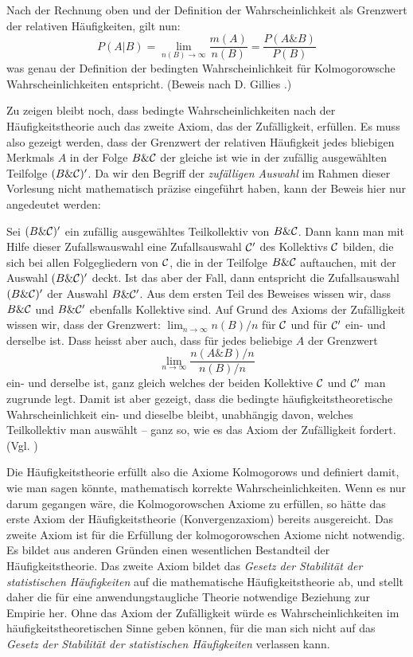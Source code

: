 Nach der Rechnung oben und der Definition der
Wahrscheinlichkeit als Grenzwert der relativen Häufigkeiten, gilt nun:
\[ P(A|B) = \lim_{n(B)\to\infty}\frac{m(A)}{n(B)} = 
            \frac{P(A\&B)}{P(B)} \]
was genau der Definition der bedingten Wahrscheinlichkeit für Kolmogorowsche
Wahrscheinlichkeiten entspricht. (Beweis nach D. Gillies
\cite[S. 111/112]{gillies:2000}.)  

Zu zeigen bleibt noch, dass bedingte Wahrscheinlichkeiten nach der
Häufigkeitstheorie auch das zweite Axiom, das der Zufälligkeit, erfüllen. Es
muss also gezeigt werden, dass der Grenzwert der relativen Häufigkeit jedes
bliebigen Merkmals $A$ in der Folge $B \& {\cal C}$ der gleiche ist wie in der
zufällig ausgewählten Teilfolge $(B \& {\cal C})'$. Da wir den Begriff der {\em
zufälligen Auswahl} im Rahmen dieser Vorlesung nicht mathematisch präzise
eingeführt haben, kann der Beweis hier nur angedeutet werden:

Sei $(B \& {\cal C})'$ ein zufällig ausgewähltes Teilkollektiv von $B \& {\cal
C}$. Dann kann man mit Hilfe dieser Zufallswauswahl eine Zufallsauswahl ${\cal C'}$
des Kollektivs ${\cal C}$ bilden, die sich bei allen Folgegliedern von ${\cal
C}$, die in der Teilfolge $B \& {\cal C}$ auftauchen, mit der Auswahl $(B \&
{\cal C})'$ deckt. Ist das aber der Fall, dann entspricht die Zufallsauswahl $(B \& {\cal
C})'$ der Auswahl $B \& {\cal C}'$. Aus dem ersten Teil des Beweises wissen
wir, dass $B \& {\cal C}$ und $B \& {\cal C'}$ ebenfalls Kollektive sind.
Auf Grund des Axioms der Zufälligkeit wissen wir, dass der Grenzwert:
$\lim_{n\to\infty}n(B)/n$ für ${\cal C}$ und für ${\cal C'}$ ein- und derselbe
ist. Dass heisst aber auch, dass für jedes beliebige $A$ der Grenzwert
\[ \lim_{n\to\infty}\frac{n(A \& B)/n}{n(B)/n} \]
ein- und derselbe ist, ganz gleich welches der beiden Kollektive ${\cal C}$ und
${\cal C'}$ man zugrunde legt. Damit ist aber gezeigt, dass die bedingte
häufigkeitstheoretische Wahrscheinlichkeit ein- und dieselbe bleibt, unabhängig
davon, welches Teilkollektiv man auswählt -- ganz so, wie es das Axiom der
Zufälligkeit fordert. (Vgl. \cite[S. 112]{gillies:2000})

Die Häufigkeitstheorie erfüllt also die Axiome Kolmogorows und definiert damit,
wie man sagen könnte, mathematisch korrekte Wahrscheinlichkeiten. Wenn es nur
darum gegangen wäre, die Kolmogorowschen Axiome zu erfüllen, so hätte das erste
Axiom der Häufigkeitstheorie (Konvergenzaxiom) bereits ausgereicht. Das zweite
Axiom ist für die Erfüllung der kolmogorowschen Axiome nicht notwendig. Es
bildet aus anderen Gründen einen wesentlichen Bestandteil der
Häufigkeitstheorie. Das zweite Axiom bildet das {\em Gesetz der Stabilität der
statistischen Häufigkeiten} auf die mathematische Häufigkeitstheorie ab, und
stellt daher die für eine anwendungstaugliche Theorie notwendige Beziehung zur
Empirie her. Ohne das Axiom der Zufälligkeit würde es Wahrscheinlichkeiten im
häufigkeitstheoretischen Sinne geben können, für die man sich nicht auf das 
{\em Gesetz der Stabilität der statistischen Häufigkeiten} verlassen kann. 

